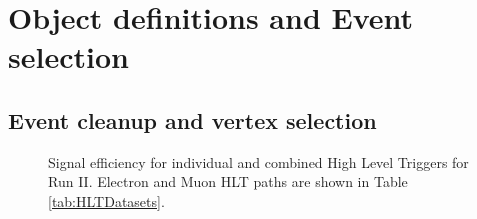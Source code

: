 \section{Object definitions and Event selection}

\subsection{Event cleanup and vertex selection}

\begin{figure}[tph]
  \centering
  \vfil
  \caption{Signal efficiency for individual and combined High Level Triggers for Run II. Electron and
    Muon HLT paths are shown in Table \ref{tab:HLTDatasets}.
  }
  \label{fig:hltSignalEfficiency}
\end{figure}


